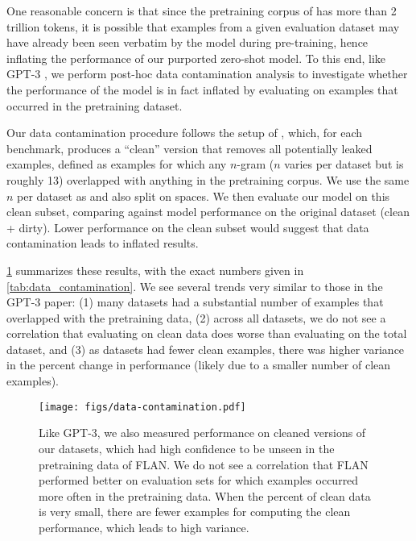 One reasonable concern is that since the pretraining corpus of \flan{} has more than 2 trillion tokens, it is possible that examples from a given evaluation dataset may have already been seen verbatim by the model during pre-training, hence inflating the performance of our purported zero-shot model.
To this end, like GPT-3 \citep{brown2020language}, we perform post-hoc data contamination analysis to investigate whether the performance of the model is in fact inflated by evaluating on examples that occurred in the pretraining dataset.

Our data contamination procedure follows the setup of \citet{brown2020language}, which, for each benchmark, produces a ``clean'' version that removes all potentially leaked examples, defined as examples for which any $n$-gram ($n$ varies per dataset but is roughly 13) overlapped with anything in the pretraining corpus.
We use the same $n$ per dataset as \citet{brown2020language} and also split on spaces.
We then evaluate our model on this clean subset, comparing against model performance on the original dataset (clean + dirty).
Lower performance on the clean subset would suggest that data contamination leads to inflated results. 

\cref{fig:data-contamination} summarizes these results, with the exact numbers given in \cref{tab:data_contamination}. 
We see several trends very similar to those in the GPT-3 paper: 
(1) many datasets had a substantial number of examples that overlapped with the pretraining data, 
(2) across all datasets, we do not see a correlation that evaluating on clean data does worse than evaluating on the total dataset, and 
(3) as datasets had fewer clean examples, there was higher variance in the percent change in performance (likely due to a smaller number of clean examples).

\begin{figure}[h]
    \centering
    \texttt{[image: figs/data-contamination.pdf]}
    \vspace{-2mm}
    \caption{Like GPT-3, we also measured performance on cleaned versions of our datasets, which had high confidence to be unseen in the pretraining data of FLAN. 
    We do not see a correlation that FLAN performed better on evaluation sets for which examples occurred more often in the pretraining data.
    When the percent of clean data is very small, there are fewer examples for computing the clean performance, which leads to high variance. 
    }
    \label{fig:data-contamination}
\end{figure}

